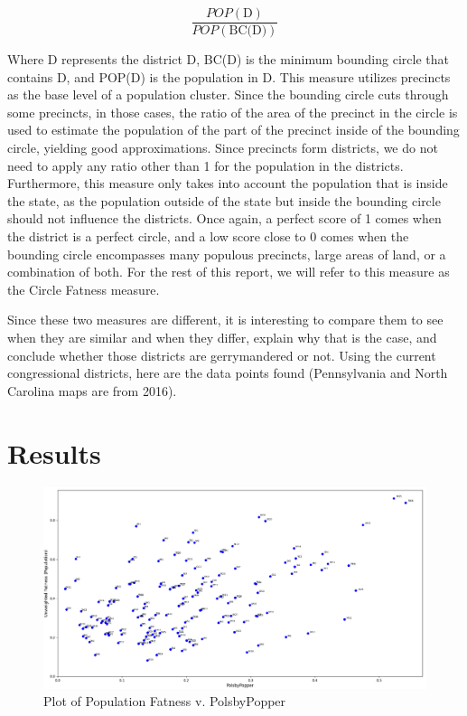 \documentclass[letterpaper]{article}
\begin{document}
\[
	\frac{POP(\text{D})}{POP(\text{BC(D)})}
\]

Where D represents the district D, BC(D) is the minimum bounding circle that contains D, and POP(D) is the population in D. This measure utilizes precincts as the base level of a population cluster. Since the bounding circle cuts through some precincts, in those cases, the ratio of the area of the precinct in the circle is used to estimate the population of the part of the precinct inside of the bounding circle, yielding good approximations. Since precincts form districts, we do not need to apply any ratio other than 1 for the population in the districts. Furthermore, this measure only takes into account the population that is inside the state, as the population outside of the state but inside the bounding circle should not influence the districts. Once again, a perfect score of 1 comes when the district is a perfect circle, and a low score close to 0 comes when the bounding circle encompasses many populous precincts, large areas of land, or a combination of both. For the rest of this report, we will refer to this measure as the Circle Fatness measure.


Since these two measures are different, it is interesting to compare them to see when they are similar and when they differ, explain why that is the case, and conclude whether those districts are gerrymandered or not. Using the current congressional districts, here are the data points found (Pennsylvania and North Carolina maps are from 2016).

\section{Results}

\begin{figure}[H]
	\includegraphics[width=\linewidth]{./figures/fatnessPopulationVpolsbyPopper.png}
	\caption{Plot of Population Fatness v. PolsbyPopper}
	\label{fig:datapoints}
\end{figure}
\end{document}
